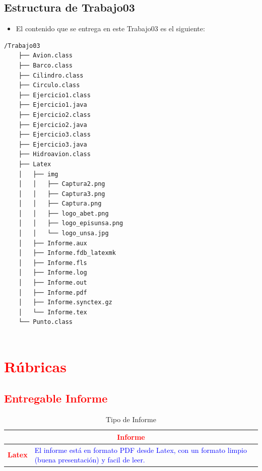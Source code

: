 \documentclass{article}
\begin{document}
	\subsection{Estructura de Trabajo03}
	\begin{itemize}	
		\item El contenido que se entrega en este Trabajo03 es el siguiente:
	\end{itemize}
	\begin{lstlisting}[style=ascii-tree]
	/Trabajo03	
	├── Avion.class
	├── Barco.class
	├── Cilindro.class
	├── Circulo.class
	├── Ejercicio1.class
	├── Ejercicio1.java
	├── Ejercicio2.class
	├── Ejercicio2.java
	├── Ejercicio3.class
	├── Ejercicio3.java
	├── Hidroavion.class
	├── Latex
	│   ├── img
	│   │   ├── Captura2.png
	│   │   ├── Captura3.png
	│   │   ├── Captura.png
	│   │   ├── logo_abet.png
	│   │   ├── logo_episunsa.png
	│   │   └── logo_unsa.jpg
	│   ├── Informe.aux
	│   ├── Informe.fdb_latexmk
	│   ├── Informe.fls
	│   ├── Informe.log
	│   ├── Informe.out
	│   ├── Informe.pdf
	│   ├── Informe.synctex.gz
	│   └── Informe.tex
	└── Punto.class
	
	\end{lstlisting}    
	\section{\textcolor{red}{Rúbricas}}
	
	\subsection{\textcolor{red}{Entregable Informe}}
	\begin{table}[H]
		\caption{Tipo de Informe}
		\setlength{\tabcolsep}{0.5em} %
		{\renewcommand{\arraystretch}{1.5}%
		\begin{tabular}{|p{3cm}|p{12cm}|}
			\hline
			\multicolumn{2}{|c|}{\textbf{\textcolor{red}{Informe}}}  \\
			\hline 
			\textbf{\textcolor{red}{Latex}} & \textcolor{blue}{El informe está en formato PDF desde Latex,  con un formato limpio (buena presentación) y facil de leer.}   \\ 
			\hline 
			
			
		\end{tabular}
	}
	\end{table}
	
	\clearpage
	
\end{document}
